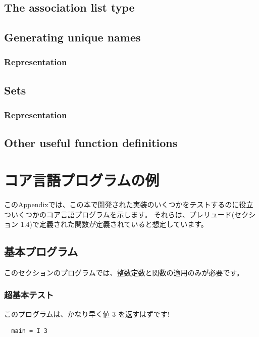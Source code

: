 \documentclass{jbook}
\begin{document}
\section{The association list type}

\section{Generating unique names}
\subsection{Representation}
\newpage

\section{Sets}
\subsection{Representation}
\newpage

\section{Other useful function definitions}
\newpage

\chapter{コア言語プログラムの例}

このAppendixでは、この本で開発された実装のいくつかをテストするのに役立ついくつかのコア言語プログラムを示します。
それらは、プレリュード(セクション 1.4)で定義された関数が定義されていると想定しています。

\section{基本プログラム}

このセクションのプログラムでは、整数定数と関数の適用のみが必要です。

\subsection{超基本テスト}

このプログラムは、かなり早く値 3 を返すはずです!

\begin{verbatim}
  main = I 3
\end{verbatim}
\end{document}
